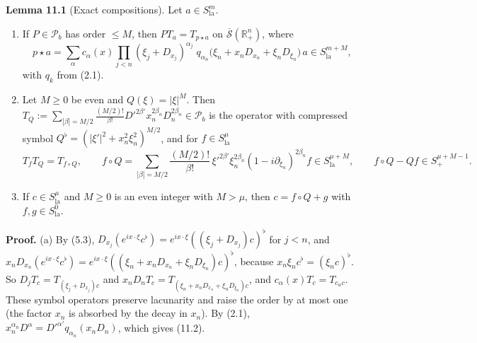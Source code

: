 \documentclass[
  11pt,
]{article}
\begin{document}
\textbf{Lemma 11.1} (Exact compositions). Let
\(a\in S^m_{\mathrm{la}}\).

\begin{enumerate}
\def\labelenumi{(\alph{enumi})}
\item
  If \(P\in\mathcal P_b\) has order \(\leq M\), then
  \(PT_a=T_{p\star a}\) on \(\overline{\mathcal S}(\mathbb R^n_+)\),
  where \[
p\star a=\sum_\alpha c_\alpha(x)\prod_{j<n}(\xi_j+D_{x_j})^{\alpha_j}\;q_{\alpha_n}\big(\xi_n+x_nD_{x_n}+\xi_nD_{\xi_n}\big)\,a\in S^{m+M}_{\mathrm{la}},
\tag{11.2}
\] with \(q_k\) from (2.1).
\item
  Let \(M\geq0\) be even and \(Q(\xi)=|\xi|^M\). Then
  \(T_Q:=\sum_{|\beta|=M/2}\frac{(M/2)!}{\beta!}D'^{2\beta'}x_n^{2\beta_n}D_n^{2\beta_n}\in\mathcal P_b\)
  is the operator with compressed symbol
  \(Q^\flat=(|\xi'|^2+x_n^2\xi_n^2)^{M/2}\), and for
  \(f\in S^\mu_{\mathrm{la}}\) {\small
\[
T_fT_Q=T_{f\circ Q},\qquad f\circ Q=\sum_{|\beta|=M/2}\frac{(M/2)!}{\beta!}\,\xi'^{2\beta'}\xi_n^{2\beta_n}(1-i\partial_{\xi_n})^{2\beta_n}f\in S^{\mu+M}_{\mathrm{la}},\qquad f\circ Q-Qf\in S^{\mu+M-1}_+ .
\tag{11.3}
\]
}
\item
  If \(c\in S^\mu_{\mathrm{la}}\) and \(M\geq0\) is an even integer with
  \(M>\mu\), then \(c=f\circ Q+g\) with \(f,g\in S^0_{\mathrm{la}}\).
\end{enumerate}

\textbf{Proof.} (a) By (5.3),
\(D_{x_j}(e^{ix\cdot\xi}c^\flat)=e^{ix\cdot\xi}((\xi_j+D_{x_j})c)^\flat\)
for \(j<n\), and
\(x_nD_{x_n}(e^{ix\cdot\xi}c^\flat)=e^{ix\cdot\xi}((\xi_n+x_nD_{x_n}+\xi_nD_{\xi_n})c)^\flat\),
because \(x_n\xi_nc^\flat=(\xi_nc)^\flat\). So
\(D_jT_c=T_{(\xi_j+D_{x_j})c}\) and
\(x_nD_nT_c=T_{(\xi_n+x_nD_{x_n}+\xi_nD_{\xi_n})c}\), and
\(c_\alpha(x)T_c=T_{c_\alpha c}\). These symbol operators preserve
lacunarity and raise the order by at most one (the factor \(x_n\) is
absorbed by the decay in \(x_n\)). By (2.1),
\(x_n^{\alpha_n}D^\alpha=D'^{\alpha'}q_{\alpha_n}(x_nD_n)\), which gives
(11.2).
\end{document}
